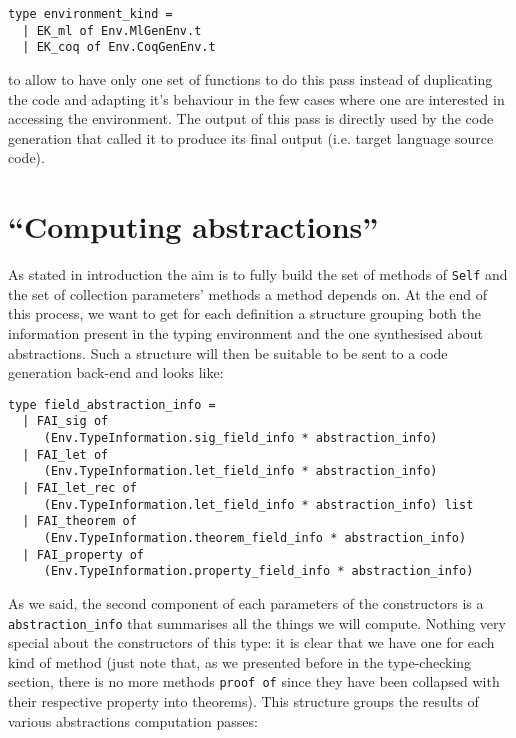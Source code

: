 {\footnotesize
\begin{lstlisting}[language=MyOCaml]
type environment_kind =
  | EK_ml of Env.MlGenEnv.t
  | EK_coq of Env.CoqGenEnv.t
\end{lstlisting}}

\noindent to allow to have only one set of functions to do this pass
instead of duplicating the code and adapting it's behaviour in the few
cases where one are interested in accessing the environment. The
output of this pass is directly used by the code generation that
called it to produce its final output (i.e. target language source
code).



\section{``Computing abstractions''}
As stated in introduction the aim is to fully build the set of
methods of {\tt Self} and the set of collection parameters' methods a
method depends on. At the end of this process, we want to get for each
definition a structure grouping both the information present in the
typing environment and the one synthesised about abstractions. Such a
structure will then be suitable to be sent to a code generation
back-end and looks like:

{\footnotesize
\begin{lstlisting}[language=MyOCaml]
type field_abstraction_info =
  | FAI_sig of
     (Env.TypeInformation.sig_field_info * abstraction_info)
  | FAI_let of
     (Env.TypeInformation.let_field_info * abstraction_info)
  | FAI_let_rec of
     (Env.TypeInformation.let_field_info * abstraction_info) list
  | FAI_theorem of
     (Env.TypeInformation.theorem_field_info * abstraction_info)
  | FAI_property of
     (Env.TypeInformation.property_field_info * abstraction_info)
\end{lstlisting}}

As we said, the second component of each parameters of the
constructors is a {\tt abstraction\_info} that summarises all the
things we will compute. Nothing very special about the constructors of
this type: it is clear that we have one for each kind of method (just
note that, as we presented before in the type-checking section, there
is no more methods {\tt proof of} since they have been collapsed with
their respective property into theorems). This structure groups the
results of various abstractions computation passes:

